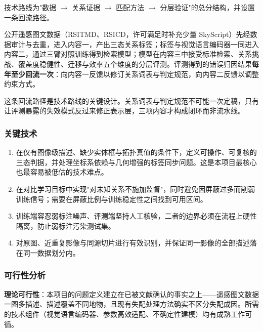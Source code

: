 技术路线为"数据 $\rightarrow$ 关系证据 $\rightarrow$ 匹配方法 $\rightarrow$ 分层验证"的总分结构，并设置一条回流路径。

公开遥感图文数据（RSITMD、RSICD，许可满足时补充少量 SkyScript\cite{wang2024skyscript}）先经数据审计与去重，进入内容一，产出三态关系标签；标签与视觉语言编码器一同进入内容二，通过三臂对照训练得到检索模型；模型在内容三中接受标准检索、关系挑战、覆盖度稳健性、迁移与效率五个维度的分层评测。评测得到的错误归因结果\textbf{每年至少回流一次}：向内容一反馈以修订关系词表与判定规范，向内容二反馈以调整约束方式。

这条回流路径是技术路线的关键设计。关系词表与判定规范不可能一次定稿，只有让评测暴露的失效模式反过来修正表示层，三项内容才构成闭环而非流水线。

\subsubsection{关键技术}

\begin{enumerate}
    \item {}在仅有图像级描述、缺少实体框与拓扑真值的条件下，定义可操作、可复核的三态判据，并处理坐标系依赖与几何增强的标签同步问题。这是本项目最核心也最容易被低估的技术难点。
    \item {}在对比学习目标中实现"对未知关系不施加监督"，同时避免因屏蔽过多而削弱训练信号；需要在屏蔽比例与训练稳定性之间找到可用区间。
    \item {}训练端容忍弱标注噪声、评测端坚持人工核验，二者的边界必须在流程上硬性隔离，防止弱标注污染测试集。
    \item {}对原图、近重复影像与同源切片进行有效识别，并保证同一影像的全部描述落在同一数据划分内。
\end{enumerate}

\subsubsection{可行性分析}

\textbf{理论可行性}：本项目的问题定义建立在已被文献确认的事实之上——遥感图文数据一图多描述、描述覆盖不同地物\cite{lu2018rsicd,yuan2022amfmn}，且现有失配处理方法确实不区分失配成因\cite{pmpguard2026,hu2023rcl,han2023msc}。所需的技术组件（视觉语言编码器、参数高效适配、不确定性建模）均有成熟工作可循\cite{radford2021clip,liu2024remoteclip,yuan2023peft,chun2021pcme,li2023pau}。

